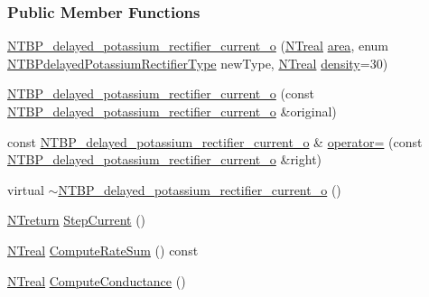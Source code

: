 \subsubsection*{Public Member Functions}
\begin{DoxyCompactItemize}
\item 
\hyperlink{class_n_t_b_p__delayed__potassium__rectifier__current__o_a70e4698fb61a53d7799dc34d080f025b}{NTBP\_\-delayed\_\-potassium\_\-rectifier\_\-current\_\-o} (\hyperlink{nt__types_8h_a814a97893e9deb1eedcc7604529ba80d}{NTreal} \hyperlink{class_n_t_b_p__channels__current__o_af88f0d6c8df84ab148c87484f39ee2b7}{area}, enum \hyperlink{ntbp__object__obj_8h_aeeceaef81d00b84a44823ba078e4fcd3}{NTBPdelayedPotassiumRectifierType} newType, \hyperlink{nt__types_8h_a814a97893e9deb1eedcc7604529ba80d}{NTreal} \hyperlink{class_n_t_b_p__channels__current__o_a8f486ec47e3aeef298a33b735758aa9f}{density}=30)
\item 
\hyperlink{class_n_t_b_p__delayed__potassium__rectifier__current__o_ad6ead6364cd0a050e5754daa2b5787fd}{NTBP\_\-delayed\_\-potassium\_\-rectifier\_\-current\_\-o} (const \hyperlink{class_n_t_b_p__delayed__potassium__rectifier__current__o}{NTBP\_\-delayed\_\-potassium\_\-rectifier\_\-current\_\-o} \&original)
\item 
const \hyperlink{class_n_t_b_p__delayed__potassium__rectifier__current__o}{NTBP\_\-delayed\_\-potassium\_\-rectifier\_\-current\_\-o} \& \hyperlink{class_n_t_b_p__delayed__potassium__rectifier__current__o_a28828b0a569bb42ff49fe83b765e456a}{operator=} (const \hyperlink{class_n_t_b_p__delayed__potassium__rectifier__current__o}{NTBP\_\-delayed\_\-potassium\_\-rectifier\_\-current\_\-o} \&right)
\item 
virtual \hyperlink{class_n_t_b_p__delayed__potassium__rectifier__current__o_a7b0d88c2a0ff9448965b6974b4856d5f}{$\sim$NTBP\_\-delayed\_\-potassium\_\-rectifier\_\-current\_\-o} ()
\item 
\hyperlink{nt__types_8h_ab9564ee8f091e809d21b8451c6683c53}{NTreturn} \hyperlink{class_n_t_b_p__delayed__potassium__rectifier__current__o_ab31f57f64700f325ad2ce3e034326441}{StepCurrent} ()
\item 
\hyperlink{nt__types_8h_a814a97893e9deb1eedcc7604529ba80d}{NTreal} \hyperlink{class_n_t_b_p__delayed__potassium__rectifier__current__o_a7a86bed4bb048bfd664d47276cb252ce}{ComputeRateSum} () const 
\item 
\hyperlink{nt__types_8h_a814a97893e9deb1eedcc7604529ba80d}{NTreal} \hyperlink{class_n_t_b_p__delayed__potassium__rectifier__current__o_a3cabb7013d0a6243efd4906b1e462759}{ComputeConductance} ()

\end{DoxyCompactItemize}
